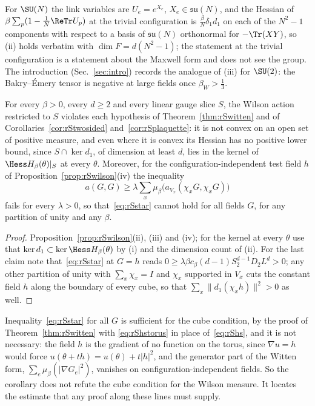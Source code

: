 For $\SU(N)$ the link variables are $U_e=e^{X_e}$, $X_e\in\mathfrak{su}(N)$,
and the Hessian of $\beta\sum_p(1-\frac1N\ReTr U_p)$ at the trivial
configuration is $\frac\beta{N}\delta_1d_1$ on each of the $N^2-1$
components with respect to a basis of $\mathfrak{su}(N)$ orthonormal for
$-\Tr(XY)$, so (ii) holds verbatim with $\dim F=d(N^2-1)$; the statement at
the trivial configuration is a statement about the Maxwell form and does not
see the group. The introduction (Sec.~\ref{sec:intro}) records the analogue of
(iii) for $\SU(2)$: the Bakry--\'Emery tensor is negative at large fields
once $\beta_W>\frac13$.

\begin{corollary}
\label{cor:rSnoapply}
For every $\beta>0$, every $d\ge2$ and every linear gauge slice $S$, the
Wilson action restricted to $S$ violates each hypothesis of
Theorem~\ref{thm:rSwitten} and of Corollaries~\ref{cor:rStwosided}
and~\ref{cor:rSplaquette}: it is not convex on an open set of positive
measure, and even where it is convex its Hessian has no positive lower
bound, since $S\cap\ker d_1$, of dimension at least $d$, lies in the kernel
of $\Hess H_\beta(\theta)|_S$ at every $\theta$. Moreover, for the
configuration-independent test field $h$ of
Proposition~\ref{prop:rSwilson}(iv) the inequality
\begin{equation}\label{eq:rSstar}
a(G,G)\ge\lambda\sum_x\mu_\beta\bigl(a_{V_x}(\chi_xG,\chi_xG)\bigr)
\end{equation}
fails for every $\lambda>0$, so that~\eqref{eq:rSstar} cannot hold for all
fields $G$, for any partition of unity and any $\beta$.
\end{corollary}

\begin{proof}
Proposition~\ref{prop:rSwilson}(ii), (iii) and (iv); for the kernel at every
$\theta$ use that $\ker d_1\subset\ker\Hess H_\beta(\theta)$ by (i) and the
dimension count of (ii). For the last claim note that~\eqref{eq:rSstar} at
$G=h$ reads $0\ge\lambda\beta c_\beta(d-1)S_2^{d-1}D_2L^d>0$; any other
partition of unity with $\sum_x\chi_x=I$ and $\chi_x$ supported in $V_x$
cuts the constant field $h$ along the boundary of every cube, so that
$\sum_x\lVert d_1(\chi_xh)\rVert^2>0$ as well.
\end{proof}

Inequality~\eqref{eq:rSstar} for all $G$ is sufficient for the cube
condition, by the proof of Theorem~\ref{thm:rSwitten} with
\eqref{eq:rShstorus} in place of~\eqref{eq:rShs}, and it is not necessary:
the field $h$ is the gradient of no function on the torus, since $\nabla u=h$
would force $u(\theta+th)=u(\theta)+t\lvert h\rvert^2$, and the generator part
of the Witten form, $\sum_e\mu_\beta(\lvert\nabla G_e\rvert^2)$, vanishes on
configuration-independent fields. So the corollary does not refute the cube
condition for the Wilson measure. It locates the estimate that any proof
along these lines must supply.

